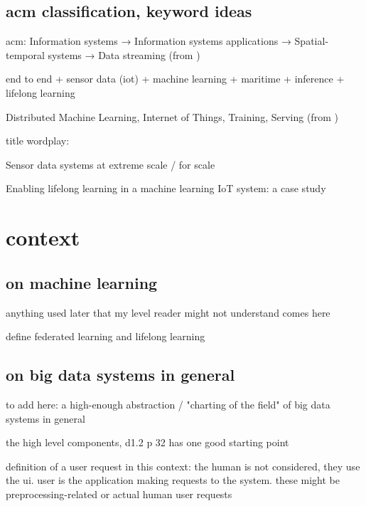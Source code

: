 \section{acm classification,  keyword ideas}

acm:
Information systems → Information systems applications →
Spatial-temporal systems → Data streaming (from \cite{uprctrajectorysystem})

end to end + sensor data (iot) + machine learning + maritime + inference + lifelong learning

Distributed Machine Learning, Internet of Things, Training, Serving (from \cite{mliot})

title wordplay:

Sensor data systems at extreme scale / for scale

Enabling lifelong learning in a machine learning IoT system: a case study

\chapter{context}

\section{on machine learning}

anything used later that my level reader might not understand comes here

define federated learning and lifelong learning

\section{on big data systems in general}

to add here: a high-enough abstraction / "charting of the field" of big data systems in general

the high level components, d1.2 p 32 has one good starting point

definition of a user request in this context: the human is not considered, they use the ui. user is the application making requests to the system. these might be preprocessing-related or actual human user requests


